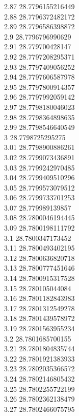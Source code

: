 {2.87	28.7796155216449\\
2.88	28.7796372482172\\
2.89	28.7796586398872\\
2.9	28.7796796990629\\
2.91	28.779700428147\\
2.92	28.7797208295371\\
2.93	28.7797409056252\\
2.94	28.7797606587978\\
2.95	28.7797800914357\\
2.96	28.7797992059142\\
2.97	28.7798180046023\\
2.98	28.7798364898635\\
2.99	28.7798546640549\\
3	28.7798725295275\\
3.01	28.7798900886261\\
3.02	28.7799073436891\\
3.03	28.7799242970485\\
3.04	28.7799409510296\\
3.05	28.7799573079512\\
3.06	28.7799733701253\\
3.07	28.779989139857\\
3.08	28.7800046194445\\
3.09	28.7800198111792\\
3.1	28.7800347173452\\
3.11	28.7800493402195\\
3.12	28.7800636820718\\
3.13	28.7800777451646\\
3.14	28.7800915317528\\
3.15	28.780105044084\\
3.16	28.7801182843983\\
3.17	28.7801312549278\\
3.18	28.7801439578972\\
3.19	28.7801563955234\\
3.2	28.7801685700155\\
3.21	28.7801804835744\\
3.22	28.7801921383933\\
3.23	28.7802035366572\\
3.24	28.7802146805432\\
3.25	28.7802255722199\\
3.26	28.7802362138479\\
3.27	28.7802466075795\\
}
